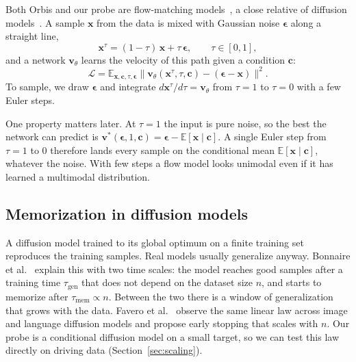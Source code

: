 Both Orbis and our probe are flow-matching models~\cite{lipman_fm}, a close
relative of diffusion models~\cite{ho_ddpm}. A sample $\mathbf{x}$ from the data
is mixed with Gaussian noise $\boldsymbol{\epsilon}$ along a straight line,
\begin{equation}
\mathbf{x}^{\tau} = (1-\tau)\,\mathbf{x} + \tau\,\boldsymbol{\epsilon},
\qquad \tau\in[0,1],
\label{eq:fm-path}
\end{equation}
and a network $\mathbf{v}_\theta$ learns the velocity of this path given a
condition $\mathbf{c}$:
\begin{equation}
\mathcal{L} = \mathbb{E}_{\mathbf{x},\mathbf{c},\tau,\boldsymbol{\epsilon}}
\big\lVert \mathbf{v}_\theta(\mathbf{x}^{\tau},\tau,\mathbf{c})
- (\boldsymbol{\epsilon}-\mathbf{x}) \big\rVert^2 .
\label{eq:fm-loss}
\end{equation}
To sample, we draw $\boldsymbol{\epsilon}$ and integrate
$d\mathbf{x}^\tau/d\tau=\mathbf{v}_\theta$ from $\tau=1$ to $\tau=0$ with a few
Euler steps.

One property matters later. At $\tau=1$ the input is pure noise, so the best
the network can predict is
$\mathbf{v}^\ast(\boldsymbol{\epsilon},1,\mathbf{c}) =
\boldsymbol{\epsilon}-\mathbb{E}[\mathbf{x}\mid\mathbf{c}]$. A single Euler step
from $\tau=1$ to $0$ therefore lands every sample on the conditional mean
$\mathbb{E}[\mathbf{x}\mid\mathbf{c}]$, whatever the noise. With few steps a
flow model looks unimodal even if it has learned a multimodal distribution.

\subsection{Memorization in diffusion models}
\label{sec:memorization}

A diffusion model trained to its global optimum on a finite training set
reproduces the training samples. Real models usually generalize anyway. Bonnaire
et al.~\cite{bonnaire} explain this with two time scales: the model reaches good
samples after a training time $\tau_{\text{gen}}$ that does not depend on the
dataset size $n$, and starts to memorize after $\tau_{\text{mem}}\propto n$.
Between the two there is a window of generalization that grows with the data.
Favero et al.~\cite{favero} observe the same linear law across image and
language diffusion models and propose early stopping that scales with $n$. Our
probe is a conditional diffusion model on a small target, so we can test this law
directly on driving data (Section~\ref{sec:scaling}).

